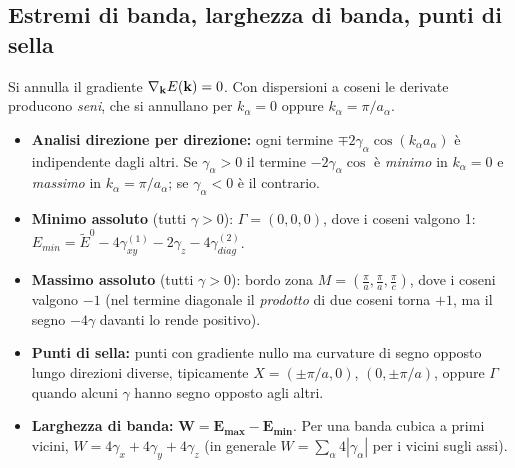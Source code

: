 \pagebreak

\subsection{Estremi di banda, larghezza di banda, punti di sella}
Si annulla il gradiente $\nabla_{\mathbf{k}} E(\mathbf{k})=0$. Con dispersioni a coseni le derivate producono \emph{seni}, che si annullano per $k_\alpha = 0$ oppure $k_\alpha = \pi/a_\alpha$.
\begin{itemize}
  \item \textbf{Analisi direzione per direzione:} ogni termine $\mp 2\gamma_\alpha\cos(k_\alpha a_\alpha)$ è indipendente dagli altri. Se $\gamma_\alpha>0$ il termine $-2\gamma_\alpha\cos$ è \emph{minimo} in $k_\alpha=0$ e \emph{massimo} in $k_\alpha=\pi/a_\alpha$; se $\gamma_\alpha<0$ è il contrario.
  \item \textbf{Minimo assoluto} (tutti $\gamma>0$): $\Gamma=(0,0,0)$, dove i coseni valgono 1:
  $E_{min}=\tilde E^0 - 4\gamma_{xy}^{(1)}-2\gamma_z-4\gamma_{diag}^{(2)}$.
  \item \textbf{Massimo assoluto} (tutti $\gamma>0$): bordo zona $M=\left(\frac{\pi}{a},\frac{\pi}{a},\frac{\pi}{c}\right)$, dove i coseni valgono $-1$ (nel termine diagonale il \emph{prodotto} di due coseni torna $+1$, ma il segno $-4\gamma$ davanti lo rende positivo).
  \item \textbf{Punti di sella:} punti con gradiente nullo ma curvature di segno opposto lungo direzioni diverse, tipicamente $X=(\pm\pi/a,0)$, $(0,\pm\pi/a)$, oppure $\Gamma$ quando alcuni $\gamma$ hanno segno opposto agli altri.
  \item \textbf{Larghezza di banda:} $\bm{W = E_{max}-E_{min}}$. Per una banda cubica a primi vicini, $W = 4\gamma_x+4\gamma_y+4\gamma_z$ (in generale $W=\sum_\alpha 4|\gamma_\alpha|$ per i vicini sugli assi).
\end{itemize}



